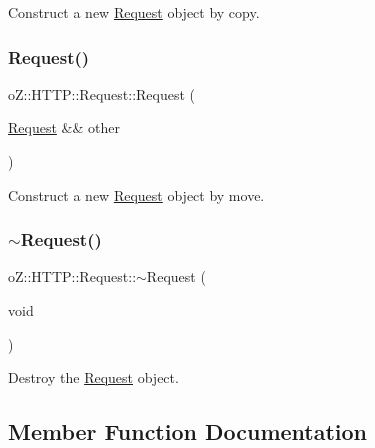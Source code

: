 Construct a new \mbox{\hyperlink{classo_z_1_1_h_t_t_p_1_1_request}{Request}} object by copy. 

\mbox{\label{classo_z_1_1_h_t_t_p_1_1_request_ab2033d92faeb72d7488477cc4f9859d5}} 
\subsubsection{\texorpdfstring{Request()}{Request()}\hspace{0.1cm}{\footnotesize\ttfamily [3/3]}}
{\footnotesize\ttfamily o\+Z\+::\+H\+T\+T\+P\+::\+Request\+::\+Request (\begin{DoxyParamCaption}\item[{\mbox{\hyperlink{classo_z_1_1_h_t_t_p_1_1_request}{Request}} \&\&}]{other }\end{DoxyParamCaption})\hspace{0.3cm}{\ttfamily [default]}}



Construct a new \mbox{\hyperlink{classo_z_1_1_h_t_t_p_1_1_request}{Request}} object by move. 

\mbox{\label{classo_z_1_1_h_t_t_p_1_1_request_a2bc2913d79ffe8ce63a19c480b9cf330}} 
\subsubsection{\texorpdfstring{$\sim$Request()}{~Request()}}
{\footnotesize\ttfamily o\+Z\+::\+H\+T\+T\+P\+::\+Request\+::$\sim$\+Request (\begin{DoxyParamCaption}\item[{void}]{ }\end{DoxyParamCaption})\hspace{0.3cm}{\ttfamily [default]}}



Destroy the \mbox{\hyperlink{classo_z_1_1_h_t_t_p_1_1_request}{Request}} object. 



\subsection{Member Function Documentation}
\mbox{\label{classo_z_1_1_h_t_t_p_1_1_request_a8be8c50762b4faacfbec6f671233fb87}} 

